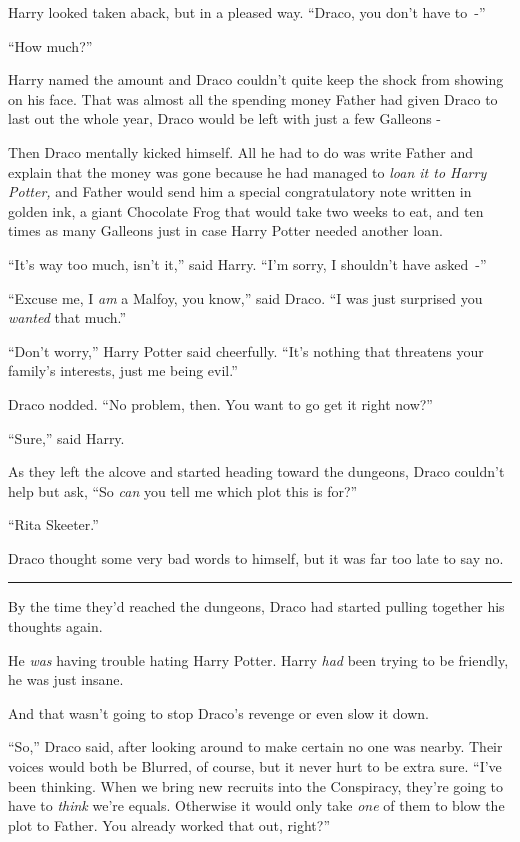 Harry looked taken aback, but in a pleased way. ``Draco, you don't have to~-''

``How much?''

Harry named the amount and Draco couldn't quite keep the shock from showing on his face. That was almost all the spending money Father had given Draco to last out the whole year, Draco would be left with just a few Galleons -

Then Draco mentally kicked himself. All he had to do was write Father and explain that the money was gone because he had managed to \emph{loan it to Harry Potter,} and Father would send him a special congratulatory note written in golden ink, a giant Chocolate Frog that would take two weeks to eat, and ten times as many Galleons just in case Harry Potter needed another loan.

``It's way too much, isn't it,'' said Harry. ``I'm sorry, I shouldn't have asked~-''

``Excuse me, I \emph{am} a Malfoy, you know,'' said Draco. ``I was just surprised you \emph{wanted} that much.''

``Don't worry,'' Harry Potter said cheerfully. ``It's nothing that threatens your family's interests, just me being evil.''

Draco nodded. ``No problem, then. You want to go get it right now?''

``Sure,'' said Harry.

As they left the alcove and started heading toward the dungeons, Draco couldn't help but ask, ``So \emph{can} you tell me which plot this is for?''

``Rita Skeeter.''

Draco thought some very bad words to himself, but it was far too late to say no.

\begin{center}\rule{3in}{0.4pt}\end{center}

By the time they'd reached the dungeons, Draco had started pulling together his thoughts again.

He \emph{was} having trouble hating Harry Potter. Harry \emph{had} been trying to be friendly, he was just insane.

And that wasn't going to stop Draco's revenge or even slow it down.

``So,'' Draco said, after looking around to make certain no one was nearby. Their voices would both be Blurred, of course, but it never hurt to be extra sure. ``I've been thinking. When we bring new recruits into the Conspiracy, they're going to have to \emph{think} we're equals. Otherwise it would only take \emph{one} of them to blow the plot to Father. You already worked that out, right?''

